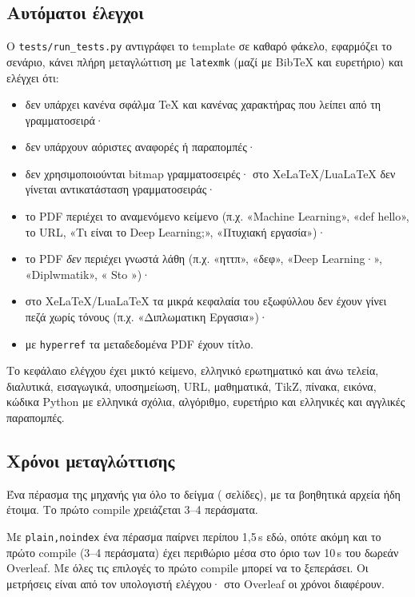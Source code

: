 \documentclass[a4paper,11pt]{article}
\begin{document}
\subsection{Αυτόματοι έλεγχοι}\label{sec:tests}
Ο \texttt{tests/run\_tests.py} αντιγράφει το template σε καθαρό φάκελο,
εφαρμόζει το σενάριο, κάνει πλήρη μεταγλώττιση με \texttt{latexmk} (μαζί με
BibTeX και ευρετήριο) και ελέγχει ότι:
\begin{itemize}
	\item δεν υπάρχει κανένα σφάλμα TeX και κανένας χαρακτήρας που λείπει από τη γραμματοσειρά·
	\item δεν υπάρχουν αόριστες αναφορές ή παραπομπές·
	\item δεν χρησιμοποιούνται bitmap γραμματοσειρές· στο XeLaTeX/LuaLaTeX δεν γίνεται αντικατάσταση γραμματοσειράς·
	\item το PDF περιέχει το αναμενόμενο κείμενο (π.χ. «Machine Learning», «def hello», το URL, «Τι είναι το Deep Learning;», «Πτυχιακή εργασία»)·
	\item το PDF \emph{δεν} περιέχει γνωστά λάθη (π.χ. «ηττπ», «δεφ», «Deep Learning·», «\foreignlanguage{english}{Diplwmatik}», «\foreignlanguage{english}{ Sto }»)·
	\item στο XeLaTeX/LuaLaTeX τα μικρά κεφαλαία του εξωφύλλου δεν έχουν γίνει πεζά χωρίς τόνους (π.χ. «Διπλωματικη Εργασια»)·
	\item με \texttt{hyperref} τα μεταδεδομένα PDF έχουν τίτλο.
\end{itemize}
Το κεφάλαιο ελέγχου έχει μικτό κείμενο, ελληνικό ερωτηματικό και άνω τελεία,
διαλυτικά, εισαγωγικά, υποσημείωση, URL, μαθηματικά, TikZ, πίνακα, εικόνα,
κώδικα Python με ελληνικά σχόλια, αλγόριθμο, ευρετήριο και ελληνικές και
αγγλικές παραπομπές.



\subsection{Χρόνοι μεταγλώττισης}
Ένα πέρασμα της μηχανής για όλο το δείγμα (\pagesample{} σελίδες), με τα
βοηθητικά αρχεία ήδη έτοιμα. Το πρώτο compile χρειάζεται 3–4 περάσματα.

Με \texttt{plain,noindex} ένα πέρασμα παίρνει περίπου 1,5\,s εδώ, οπότε
ακόμη και το πρώτο compile (3–4 περάσματα) έχει περιθώριο μέσα στο όριο των
10\,s του δωρεάν Overleaf. Με όλες τις επιλογές το πρώτο compile μπορεί να το
ξεπεράσει. Οι μετρήσεις είναι από τον υπολογιστή ελέγχου· στο Overleaf οι
χρόνοι διαφέρουν.
\end{document}
